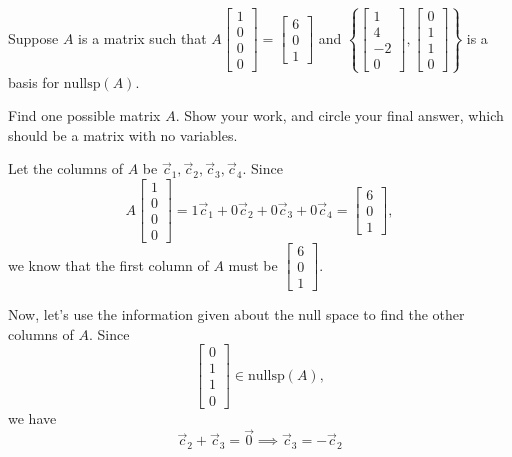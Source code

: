 \documentclass[11pt]{article}
\begin{document}
\begin{prob}[(10 pts)]
Suppose $A$ is a matrix such that $A \begin{bmatrix} 1 \\ 0 \\ 0 \\ 0 \end{bmatrix} = \begin{bmatrix} 6 \\ 0 \\ 1 \end{bmatrix}$ and $\left\{ \begin{bmatrix} 1 \\ 4 \\ -2 \\ 0 \end{bmatrix}, \begin{bmatrix} 0 \\ 1 \\ 1 \\ 0\end{bmatrix} \right\}$ is a basis for $\text{nullsp}(A)$.

Find one possible matrix $A$. Show your work, and $\boxed{\text{circle}}$ your final answer, which should be a matrix with no variables.

\emptybox{18.25cm}

\begin{solution}
Let the columns of $A$ be $\vec c_1, \vec c_2, \vec c_3, \vec c_4$. Since
\[
A \begin{bmatrix} 1 \\ 0 \\ 0 \\ 0 \end{bmatrix} = 1\vec c_1 + 0\vec c_2 + 0\vec c_3 + 0\vec c_4 = \begin{bmatrix} 6 \\ 0 \\ 1 \end{bmatrix},
\]
we know that the first column of $A$ must be $\begin{bmatrix} 6 \\ 0 \\ 1 \end{bmatrix}$.

Now, let's use the information given about the null space to find the other columns of $A$. Since
\[
\begin{bmatrix} 0 \\ 1 \\ 1 \\ 0 \end{bmatrix} \in \text{nullsp}(A),
\]
we have
\[
\vec c_2 + \vec c_3 = \vec 0 \implies \vec c_3 = -\vec c_2
\]


\end{solution}
\end{prob}
\end{document}
